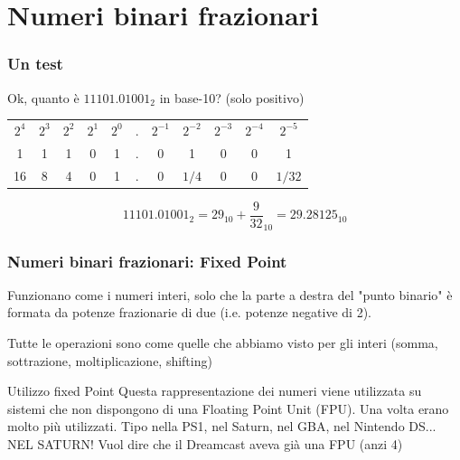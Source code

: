 \documentclass{beamer}
\begin{document}
  \section[Fixed]{Numeri binari frazionari}
  \begin{frame}
  		\frametitle{Un test}
  		Ok, quanto è $11101.01001_{2}$ in base-10? (solo positivo)
  		
  		\vspace{2em}
    \pause
		\begin{center}
		\begin{tabular}{ccccccccccc} 
		 $2^4$ & $2^3$ & $2^2$ & $2^1$ & $2^0$ & . & $2^{-1}$ & $2^{-2}$ & $2^{-3}$ & $2^{-4}$ & $2^{-5}$ \\		 
		 1 & 1 & 1 & 0 & 1 & . & 0 & 1 & 0 & 0 & 1 \\ 
		\hline 
		 16 & 8 & 4 & 0 & 1 & . & 0 & $1/4$ & 0 & 0 & $1/32$ \\ 
		\end{tabular}
		\end{center}
		\pause
		\vspace{2em}
		
		$$11101.01001_{2} = 29_{10} + \frac{9}{32}_{10} = 29.28125_{10} $$
  		
  \end{frame}
  \begin{frame}
  		\frametitle{Numeri binari frazionari: Fixed Point}
  		Funzionano come i numeri interi, solo che la parte a destra del "punto binario" è formata
  		da potenze frazionarie di due (i.e. potenze negative di 2).
  		
  		\vspace{2em}
  		
  	  Tutte le operazioni sono come quelle che abbiamo visto per gli interi (somma, sottrazione, moltiplicazione, shifting)
  	  
  	  \vspace{2em}
  	  
  	  \begin{block}{Utilizzo fixed Point}
  	  		Questa rappresentazione dei numeri viene utilizzata su sistemi che non dispongono di una Floating
  	  		Point Unit (FPU). Una volta erano molto più utilizzati. Tipo nella PS1, nel Saturn, nel GBA, nel
  	  		Nintendo DS... NEL SATURN! Vuol dire che il Dreamcast aveva già una FPU (anzi 4)
  	  \end{block}
    
  \end{frame}
\end{document}
